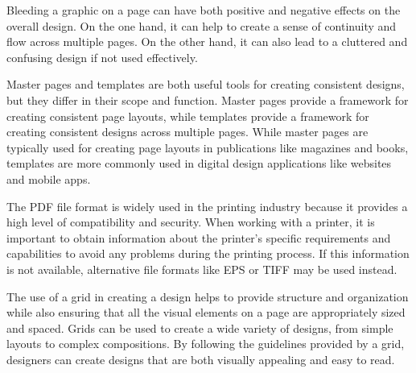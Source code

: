 \documentclass{report}
\begin{document}
    \bigbreak \noindent \bigbreak \noindent 
    \bigbreak \noindent 
    \bigbreak \noindent 
    Bleeding a graphic on a page can have both positive and negative effects on the overall design.
    On the one hand, it can help to create a sense of continuity and flow across multiple pages.
    On the other hand, it can also lead to a cluttered and confusing design if not used effectively.
    
    \bigbreak \noindent \bigbreak \noindent 
    \bigbreak \noindent 
    \bigbreak \noindent 
    Master pages and templates are both useful tools for creating consistent designs, but they differ in their scope and function.
    Master pages provide a framework for creating consistent page layouts, while templates provide a framework for creating consistent designs across multiple pages.
    While master pages are typically used for creating page layouts in publications like magazines and books, templates are more commonly used in digital design applications like websites and mobile apps.
    
    \bigbreak \noindent \bigbreak \noindent 
    \bigbreak \noindent 
    \bigbreak \noindent 
    The PDF file format is widely used in the printing industry because it provides a high level of compatibility and security.
    When working with a printer, it is important to obtain information about the printer's specific requirements and capabilities to avoid any problems during the printing process.
    If this information is not available, alternative file formats like EPS or TIFF may be used instead.
    
    \bigbreak \noindent \bigbreak \noindent 
    \bigbreak \noindent 
    \bigbreak \noindent 
    The use of a grid in creating a design helps to provide structure and organization while also ensuring that all the visual elements on a page are appropriately sized and spaced.
    Grids can be used to create a wide variety of designs, from simple layouts to complex compositions.
    By following the guidelines provided by a grid, designers can create designs that are both visually appealing and easy to read.
    
\end{document}
